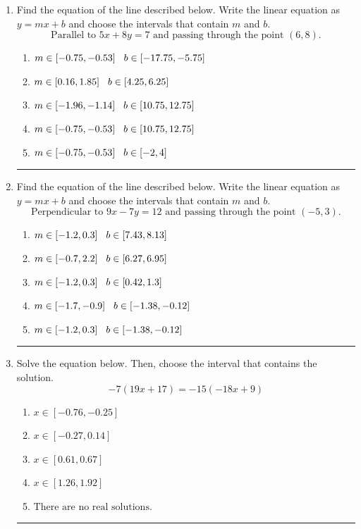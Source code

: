 \documentclass[14pt]{extbook}
\newcommand{\litem}[1]{\item#1\hspace*{-1cm}\rule{\textwidth}{0.4pt}}
\begin{document}
\begin{enumerate}
{\begin{enumerate}[label=\Alph*.]
\end{enumerate} }
\litem{
Find the equation of the line described below. Write the linear equation as $ y=mx+b $ and choose the intervals that contain $m$ and $b$.\[ \text{Parallel to } 5 x + 8 y = 7 \text{ and passing through the point } (6, 8). \]\begin{enumerate}[label=\Alph*.]
\item \( m \in [-0.75, -0.53] \hspace*{3mm} b \in [-17.75, -5.75] \)
\item \( m \in [0.16, 1.85] \hspace*{3mm} b \in [4.25, 6.25] \)
\item \( m \in [-1.96, -1.14] \hspace*{3mm} b \in [10.75, 12.75] \)
\item \( m \in [-0.75, -0.53] \hspace*{3mm} b \in [10.75, 12.75] \)
\item \( m \in [-0.75, -0.53] \hspace*{3mm} b \in [-2, 4] \)

\end{enumerate} }
\litem{
Find the equation of the line described below. Write the linear equation as $ y=mx+b $ and choose the intervals that contain $m$ and $b$.\[ \text{Perpendicular to } 9 x - 7 y = 12 \text{ and passing through the point } (-5, 3). \]\begin{enumerate}[label=\Alph*.]
\item \( m \in [-1.2, 0.3] \hspace*{3mm} b \in [7.43, 8.13] \)
\item \( m \in [-0.7, 2.2] \hspace*{3mm} b \in [6.27, 6.95] \)
\item \( m \in [-1.2, 0.3] \hspace*{3mm} b \in [0.42, 1.3] \)
\item \( m \in [-1.7, -0.9] \hspace*{3mm} b \in [-1.38, -0.12] \)
\item \( m \in [-1.2, 0.3] \hspace*{3mm} b \in [-1.38, -0.12] \)

\end{enumerate} }
\litem{
Solve the equation below. Then, choose the interval that contains the solution.\[ -7(19x + 17) = -15(-18x + 9) \]\begin{enumerate}[label=\Alph*.]
\item \( x \in [-0.76, -0.25] \)
\item \( x \in [-0.27, 0.14] \)
\item \( x \in [0.61, 0.67] \)
\item \( x \in [1.26, 1.92] \)
\item \( \text{There are no real solutions.} \)

\end{enumerate} }
\end{enumerate}
\end{document}
